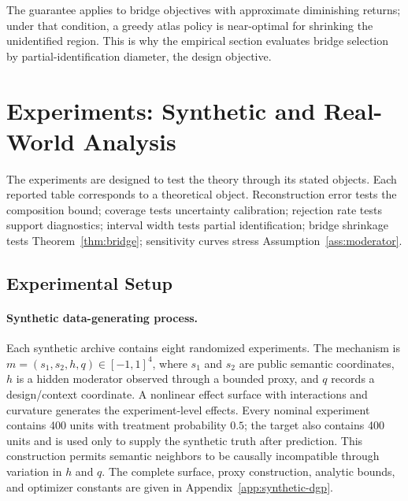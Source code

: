 \documentclass[11pt]{article}
\numberwithin{equation}{section}
\newcommand{\1}{\mathbf 1}
\begin{document}
The guarantee applies to bridge objectives with approximate diminishing returns; under that condition, a greedy atlas policy is near-optimal for shrinking the unidentified region.  This is why the empirical section evaluates bridge selection by partial-identification diameter, the design objective.

\section{Experiments: Synthetic and Real-World Analysis}
\label{sec:experiments}

The experiments are designed to test the theory through its stated objects.  Each reported table corresponds to a theoretical object.  Reconstruction error tests the composition bound; coverage tests uncertainty calibration; rejection rate tests support diagnostics; interval width tests partial identification; bridge shrinkage tests Theorem~\ref{thm:bridge}; sensitivity curves stress Assumption~\ref{ass:moderator}.

\subsection{Experimental Setup}
\paragraph{Synthetic data-generating process.}
Each synthetic archive contains eight randomized experiments.  The mechanism is $m=(s_1,s_2,h,q)\in[-1,1]^4$, where $s_1$ and $s_2$ are public semantic coordinates, $h$ is a hidden moderator observed through a bounded proxy, and $q$ records a design/context coordinate.  A nonlinear effect surface with interactions and curvature generates the experiment-level effects.  Every nominal experiment contains 400 units with treatment probability $0.5$; the target also contains 400 units and is used only to supply the synthetic truth after prediction.  This construction permits semantic neighbors to be causally incompatible through variation in $h$ and $q$.  The complete surface, proxy construction, analytic bounds, and optimizer constants are given in 
Appendix~\ref{app:synthetic-dgp}.
\end{document}
